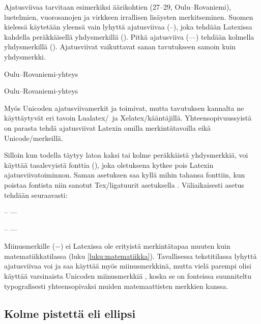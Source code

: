 Ajatusviivaa tarvitaan esimerkiksi äärikohtien (27--29,
Oulu--Rova\-niemi), luetelmien, vuorosanojen ja virkkeen irrallisen
lisäysten merkitseminen. Suomen kielessä käytetään yleensä vain lyhyttä
ajatusviivaa \mbox{(--)}, joka tehdään Latexissa kahdella peräkkäisellä
yhdysmerkillä (\koodim{--}). Pitkä ajatusviiva \mbox{(---)} tehdään
kolmella yhdysmerkillä (\koodim{---}). Ajatusviivat vaikuttavat sanan
tavutukseen samoin kuin yhdysmerkki.

\begin{koodilohkosis}
Oulu--Rovaniemi-yhteys
\end{koodilohkosis}

\begin{tulossis}
  Oulu--Rovaniemi-yhteys
\end{tulossis}

Myös Unicoden ajatusviivamerkit  ja
 toimivat, mutta tavutuksen kannalta ne
käyttäytyvät eri tavoin Lualatex\-/\ ja Xelatex\-/kääntäjillä.
Yhteensopivuussyistä on parasta tehdä ajatusviivat Latexin omilla
merkintätavoilla eikä Unicode\-/merkeillä.

Silloin kun todella täytyy latoa kaksi tai kolme peräkkäistä
yhdysmerkkiä, voi käyttää tasalevyistä fonttia
(), joka oletuksena kytkee pois Latexin
ajatusviivatoiminnon. Saman asetuksen saa kyllä mihin tahansa fonttiin,
kun poistaa fontista niin sanotut Tex\-/ligatuurit asetuksella
. Väliaikaisesti asetus tehdään
seuraavasti:

\begin{koodilohkosis}
{ -- ---}
\end{koodilohkosis}

\begin{tulossis}
  { -- ---}
\end{tulossis}

Miinusmerkille (−) ei Latexissa ole erityistä merkintätapaa muuten kuin
matematiikkatilassa (luku \ref{luku:matematiikka}). Tavallisessa
tekstitilassa lyhyttä ajatusviivaa voi ja saa käyttää myös
miinusmerkkinä, mutta vielä parempi olisi käyttää varsinaista Unicoden
miinusmerkkiä , koska se on fonteissa
suunniteltu typografisesti yhteensopivaksi muiden matemaattisten
merkkien kanssa.

\subsection{Kolme pistettä eli ellipsi}

